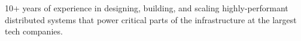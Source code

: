 \documentclass[9pt]{developercv} %
\begin{document}
\vspace{0.5cm}



\begin{minipage}[t]{0.4\textwidth} %
	\vspace{-\baselineskip} %
	
	10+ years of experience in designing, building, and scaling highly-performant distributed systems that power critical parts of the infrastructure at the largest tech companies.
\end{minipage}
\hfill %
\begin{minipage}[t]{0.5\textwidth} %
	\vspace{-\baselineskip} %
	\begin{barchart}{5.5}
	\end{barchart}
\end{minipage}


\end{document}
